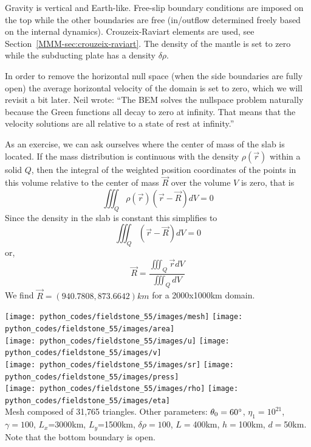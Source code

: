 Gravity is vertical and Earth-like. Free-slip boundary conditions are imposed on the top while 
the other boundaries are free (in/outflow determined freely based on the internal dynamics). 
Crouzeix-Raviart elements are used, see Section~\ref{MMM-sec:crouzeix-raviart}.
The density of the mantle is set to zero while the subducting plate has a density $\delta\rho$. 

In order to remove the horizontal null space (when the side boundaries are fully open) 
the average horizontal velocity of the domain is set to zero,
which we will revisit a bit later. Neil wrote: ``The BEM 
solves the nullspace problem naturally because the Green functions
all decay to zero at infinity. That means that the velocity solutions 
are all relative to a state of rest at infinity.''

As an exercise, we can ask ourselves where the center of mass of the slab is located.
If the mass distribution is continuous with the density $\rho(\vec{r})$ 
within a solid $Q$, then the integral of the weighted position coordinates 
of the points in this volume relative to the center of mass $\vec{R}$ over the volume $V$ is zero, 
that is
\[
\iiint_Q \rho(\vec{r}) (\vec{r}-\vec{R}) dV =0
\]
Since the density in the slab is constant this simplifies to 
\[
\iiint_Q  (\vec{r}-\vec{R}) dV =0
\]
or, 
\[
\vec{R} = \frac{ \iiint_Q  \vec{r} dV}{\iiint_Q  dV}
\]
We find $\vec{R}=(940.7808, 873.6642)km$ for a 2000x1000km domain.




\begin{center}
\texttt{[image: python\_codes/fieldstone\_55/images/mesh]}
\texttt{[image: python\_codes/fieldstone\_55/images/area]}\\
\texttt{[image: python\_codes/fieldstone\_55/images/u]}
\texttt{[image: python\_codes/fieldstone\_55/images/v]}\\
\texttt{[image: python\_codes/fieldstone\_55/images/sr]}
\texttt{[image: python\_codes/fieldstone\_55/images/press]}\\
\texttt{[image: python\_codes/fieldstone\_55/images/rho]}
\texttt{[image: python\_codes/fieldstone\_55/images/eta]}\\
{\captionfont Mesh composed of 31,765 triangles.
Other parameters: $\theta_0=60\degree$, $\eta_1=10^{21}$, $\gamma=100$, 
$L_x$=3000km, $L_y$=1500km, $\delta\rho=100$, $L=$400km, $h=$100km, $d=$50km. 
Note that the bottom boundary is open.}
\end{center}


